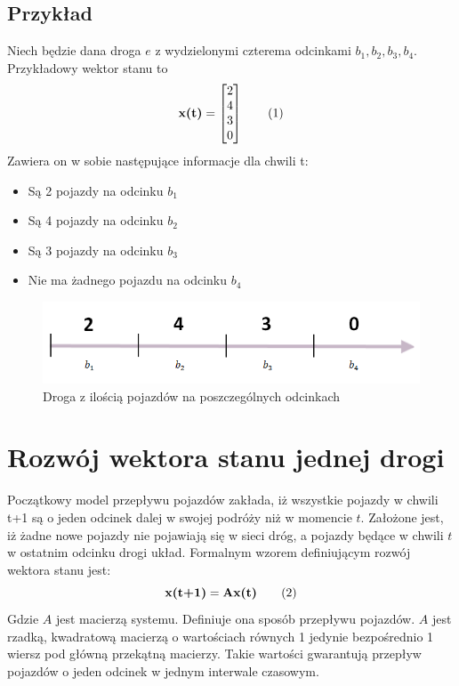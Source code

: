 \documentclass[12pt]{book}
\theoremstyle{plain}
\newcommand\addtag{\refstepcounter{equation}
\renewcommand{\labelenumii}{\theenumii}
\renewcommand{\theenumii}{\theenumi.\arabic{enumii}.}
\tag{\theequation}}
\begin{document}
\subsection{Przykład} \label{subsec:example-single-road}
Niech będzie dana droga $e$ z wydzielonymi czterema odcinkami ${b_1,b_2,b_3,b_4}$. Przykładowy wektor stanu to
\[\textbf{x(t)}=\begin{bmatrix}
2 \\ 4 \\ 3 \\ 0
\end{bmatrix} \addtag \]
Zawiera on w sobie następujące informacje dla chwili t:
\begin{itemize}
	\item Są 2 pojazdy na odcinku $b_1$
	\item Są 4 pojazdy na odcinku $b_2$
	\item Są 3 pojazdy na odcinku $b_3$
	\item Nie ma żadnego pojazdu na odcinku $b_4$
\end{itemize}

\begin{figure}[H]
	\centering
	\includegraphics[width=14cm]{single_road_example}
	\caption{Droga z ilością pojazdów na poszczególnych odcinkach}
	\label{fig:single_road}
\end{figure}
\section{Rozwój wektora stanu jednej drogi}
Początkowy model przepływu pojazdów zakłada, iż wszystkie pojazdy w chwili t+1 są o jeden odcinek dalej w swojej podróży niż w momencie $t$. Założone jest, iż żadne nowe pojazdy nie pojawiają się w sieci dróg, a pojazdy będące w chwili $t$ w ostatnim odcinku drogi układ. Formalnym wzorem definiującym rozwój wektora stanu jest:
\[\textbf{x(t+1)}=\textbf{Ax(t)} \addtag \label{eq:single_road} \]
Gdzie $A$ jest macierzą systemu. Definiuje ona sposób przepływu pojazdów. $A$ jest rzadką, kwadratową macierzą o wartościach równych 1 jedynie bezpośrednio 1 wiersz pod główną przekątną macierzy. Takie wartości gwarantują przepływ pojazdów o jeden odcinek w jednym interwale czasowym.
\end{document}
